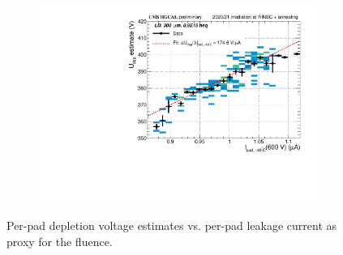 \begin{figure}
\begin{subfigure}[b]{0.32\textwidth}
		\includegraphics[width=0.999\textwidth]{plots/Vdep_vs_fluence/Vdep_vs_current_1002.pdf}
		\subcaption{
		}
		\label{plot:Vdep_vs_current_1002}
	\end{subfigure}	
	\caption{
		Per-pad depletion voltage estimates vs. per-pad leakage current as proxy for the fluence.
	}
\end{figure}


